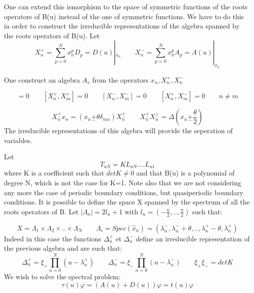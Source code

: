 \documentclass[12pt]{article}
\begin{document}
One can extend this ismorphism to the space of symmetric functions of the roots operators of B(u) instead of the one of symmetric functions. We have to do this in order to construct the irreducible representations of the algebra spanned by the roots operators of B(u). 
Let
\begin{equation}
X_{n}^{+}=\sum_{p=0}^{N} x_{n}^{p}D_{p}=D(u)|_{x_{n}} \qquad X_{n}^{-}=\sum_{p=0}^{N} x_{n}^{p}A_{p}=A(u)|_{x_{n}}
\end{equation}

One construct an algebra  $A_{s}$ from the operators ${x_{n},X_{n}^{+},X_{n}^{-}}$ 

\begin{equation}
[x_{n},x_{m}]=0 \qquad [X_{n}^{+},X_{m}^{+}]=0 \qquad [X_{n}^{-},X_{m}^{-}]=0 \qquad [X_{n}^{+},X_{m}^{-}]=0 \qquad n\neq m
\end{equation}

\begin{equation}
X_{n}^{\underset{-}{+}}x_{n}=(x_{n}\underset{-}{+}\theta\delta_{mn})X_{n}^{\underset{-}{+}} \qquad X_{n}^{\underset{-}{+}}X_{n}^{\underset{+}{-}}=\Delta(x_{n}\underset{-}{+} \frac{\theta}{2}) 
\end{equation}
The irreducible representations of this algebra will provide the seperation of variables.

Let 
\begin{equation}
T_{aN}=KL_{aN}....L_{a1}
\end{equation}
where K is a coefficient such that  $ detK\neq 0$ and that B(u) is a polynomial of degree N, which is not the case for K=1. 
Note also that we are not considering any more the case of periodic boundary conditions, but quasiperiodic boundary conditions.
It is possible to define the space X spanned by the spectrum of all the roots operators of B. Let $|\Lambda_{n}|=2l_{n}+1$ with $l_{n}=(-\frac{n}{2},..,\frac{n}{2})$ such that:

\begin{equation}
X=\Lambda_{1}\times \Lambda_{2} \times .. \times \Lambda_{N}\qquad\Lambda_{i}=Spec({\widehat{x}_{n}})=(\lambda_{n}^{-},\lambda_{n}^{-}+\theta,..,\lambda_{n}^{+}-\theta,\lambda_{n}^{+}) 
\end{equation} 
Indeed in this case the functions  $\Delta_{n}^{+}$ et $\Delta_{n}^{-}$ define an irreducible representation of the previous algebra and are such that:
\begin{equation}
\Delta_{n}^{+}=\xi_{+}\prod_{n=0}^{N} (u-\lambda_{n}^{+}) \qquad \Delta_{n}^{-}=\xi_{-}\prod_{n=0}^{N} (u-\lambda_{n}^{-}) \qquad \xi_{+}\xi_{-}=detK
\end{equation}
We wish to solve the spectral problem: $$\tau(u)\varphi=(A(u)+D(u))\varphi=t(u)\varphi $$
\end{document}
